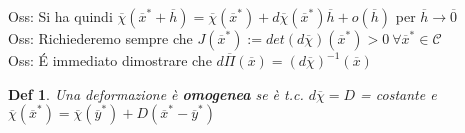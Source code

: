 \documentclass{article}
\theoremstyle{unnumbered}
\newtheorem* {theoremT}{Def}
\theoremstyle{unnumbered1}
\newenvironment{defi}{\begin{gBox}\begin{theoremT}}{\end{theoremT}\end{gBox}}
\begin{document}
Oss: Si ha quindi $\overline{\chi}(\overline{x}^*+\overline{h})=\overline{\chi}(\overline{x}^*)+d\overline{\chi}(\overline{x}^*)\overline{h} + o(\overline{h})$ per $\overline{h}\rightarrow \overline{0}$\\
%
%
%
Oss: Richiederemo sempre che $J(\overline{x}^*):=det(d\overline{\chi})(\overline{x}^*)>0 \ \forall \overline{x}^* \in \mathcal{C}$\\
Oss: É immediato dimostrare che $d\overline{\Pi}(\overline{x})=(d\overline{\chi})^{-1}(\overline{x})$\\
%
%
%
\begin{defi}
Una deformazione è \textbf{omogenea} se è t.c. $d\overline{\chi}=D$ = costante e $\overline{\chi}(\overline{x}^*)=\overline{\chi}(\overline{y}^*)+D(\overline{x}^*-\overline{y}^*)$
\end{defi}
\end{document}
